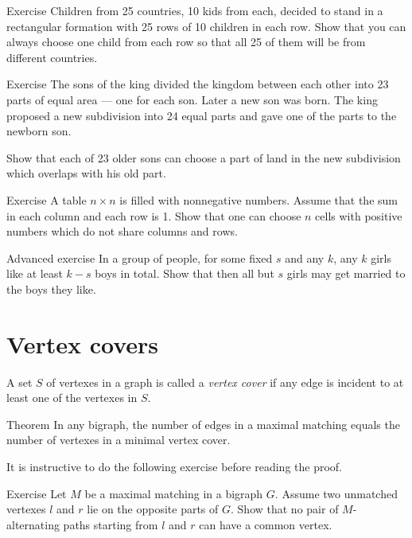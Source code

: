 \begin{thm}{Exercise}
Children from 25 countries, 10 kids from each, decided to stand in a rectangular formation with 25 rows of 10 children in each row.
Show that you can always choose one child from each row so that all 25 of them will be from different countries.
\end{thm}

\begin{thm}{Exercise}
The sons of the king divided the kingdom between each other into 23 parts of equal area --- one for each son.
Later a new son was born. 
The king proposed a new subdivision into 24 equal parts and gave one of the parts to the newborn son.

Show that each of 23 older sons can choose a part of land in the new subdivision which overlaps with his old part.
\end{thm}

\begin{thm}{Exercise} A table $n{\times}n$ is filled with nonnegative numbers.
Assume that the sum in each column and each row is 1.
Show that one can choose $n$ cells with positive numbers which do not share columns and rows. 
\end{thm}

\begin{thm}{Advanced exercise}
In a group of people, for some fixed $s$ and any $k$,
any $k$ girls like at least $k-s$ boys in total.
Show that then all but $s$ girls may get married to the boys they like.
\end{thm}



\section*{Vertex covers}

A set $S$ of vertexes in a graph is called a \emph{vertex cover} if any edge is incident to at least one of the vertexes in $S$.

\begin{thm}{Theorem}
In any bigraph, the number of edges in a maximal matching equals the number of vertexes in a minimal vertex cover.
\end{thm}

It is instructive to do the following exercise before reading the proof.

\begin{thm}{Exercise}\label{ex:two-paths}
Let $M$ be a maximal matching in a bigraph $G$.
Assume two unmatched vertexes $l$ and $r$ lie on the opposite parts of $G$.
Show that no pair of $M$-alternating paths starting from $l$ and $r$ can have a common vertex.
\end{thm}

